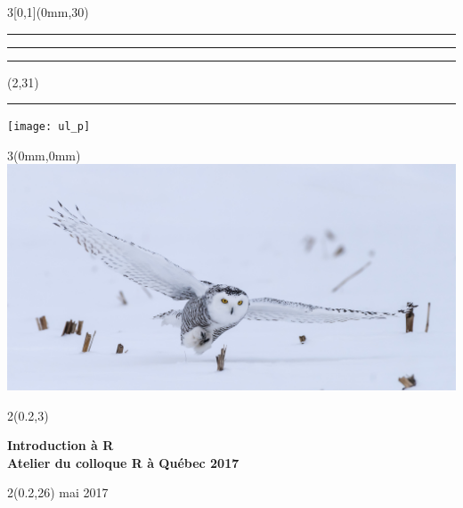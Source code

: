 \begingroup

\textblockorigin{0mm}{0mm}
\setlength{\parindent}{0mm}
\setlength{\banderougewidth}{2\TPHorizModule}
\setlength{\banderougeheight}{\TPVertModule}
\setlength{\bandeorwidth}{\TPHorizModule}
\setlength{\bandeorheight}{\banderougeheight}
\setlength{\imageheight}{29\TPVertModule}
\setlength{\imagewidth}{3\TPHorizModule}
\setlength{\logoheight}{2.5\TPVertModule}
\setlength{\gapwidth}{0.75pt}
\addtolength{\bandeorwidth}{-\gapwidth}
\addtolength{\imageheight}{-\gapwidth}

\begin{frame}[plain]
  \begin{textblock*}{3\TPHorizModule}[0,1](0mm,30\TPVertModule)
    \textcolor{rouge}{\rule{\banderougewidth}{\banderougeheight}}%
    \rule{\gapwidth}{0pt}%
    \textcolor{or}{\rule{\bandeorwidth}{\bandeorheight}}           %
  \end{textblock*}

  \begin{textblock*}{\TPHorizModule}(2\TPHorizModule,31\TPVertModule)
    \rule{\gapwidth}{0pt}%
    \texttt{[image: ul\_p]}
  \end{textblock*}

  \begin{textblock*}{3\TPHorizModule}(0mm,0mm)
    \includegraphics[height=\imageheight,width=\imagewidth]{Fotolia_99831160.jpg}
  \end{textblock*}

  \begin{textblock*}{2\TPHorizModule}(0.2\TPHorizModule,3\TPVertModule)
    \raggedright%
    \bfseries
    \fontsize{30}{30}\selectfont
    Introduction à R \\
    \mdseries
    \fontsize{14}{18}\selectfont
    Atelier du colloque R à Québec 2017
  \end{textblock*}

  \begin{textblock*}{2\TPHorizModule}(0.2\TPHorizModule,26\TPVertModule)
    \fontsize{10}{12} mai 2017
  \end{textblock*}
\end{frame}
\endgroup

